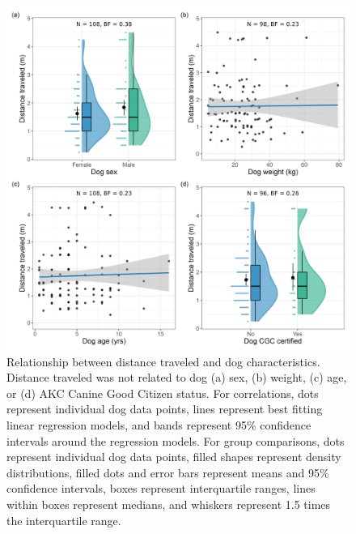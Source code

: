 \documentclass[
  pub,floatsintext]{apa6}
\begin{document}
\begin{figure}

{\centering \includegraphics[width=0.95\linewidth]{figures/dog_characteristics} 

}

\caption{Relationship between distance traveled and dog characteristics. Distance traveled was not related to dog (a) sex, (b) weight, (c) age, or (d) AKC Canine Good Citizen status. For correlations, dots represent individual dog data points, lines represent best fitting linear regression models, and bands represent 95\% confidence intervals around the regression models. For group comparisons, dots represent individual dog data points, filled shapes represent density distributions, filled dots and error bars represent means and 95\% confidence intervals, boxes represent interquartile ranges, lines within boxes represent medians, and whiskers represent 1.5 times the interquartile range. }\label{fig:dog-char}
\end{figure}
\end{document}
